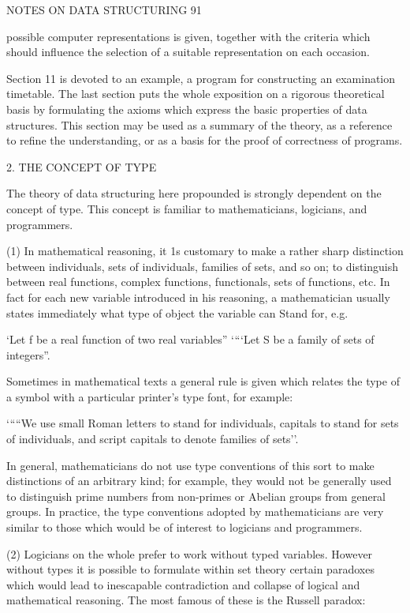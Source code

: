 NOTES ON DATA STRUCTURING 91

possible computer representations is given, together with the criteria which should influence the selection of a suitable representation on each occasion.

Section 11 is devoted to an example, a program for constructing an examination timetable. The last section puts the whole exposition on a rigorous theoretical basis by formulating the axioms which express the basic properties of data structures. This section may be used as a summary of the theory, as a reference to refine the understanding, or as a basis for the proof of correctness of programs.

2. THE CONCEPT OF TYPE

The theory of data structuring here propounded is strongly dependent on the concept of type. This concept is familiar to mathematicians, logicians, and programmers.

(1) In mathematical reasoning, it 1s customary to make a rather sharp distinction between individuals, sets of individuals, families of sets, and so on; to distinguish between real functions, complex functions, functionals, sets of functions, etc. In fact for each new variable introduced in his reasoning, a mathematician usually states immediately what type of object the variable can Stand for, e.g.

‘Let f be a real function of two real variables” ‘“‘Let S be a family of sets of integers”.

Sometimes in mathematical texts a general rule is given which relates the type of a symbol with a particular printer’s type font, for example:

‘““We use small Roman letters to stand for individuals, capitals to stand for sets of individuals, and script capitals to denote families of sets’’.

In general, mathematicians do not use type conventions of this sort to make distinctions of an arbitrary kind; for example, they would not be generally used to distinguish prime numbers from non-primes or Abelian groups from general groups. In practice, the type conventions adopted by mathematicians are very similar to those which would be of interest to logicians and programmers.

(2) Logicians on the whole prefer to work without typed variables. However without types it is possible to formulate within set theory certain paradoxes which would lead to inescapable contradiction and collapse of logical and mathematical reasoning. The most famous of these is the Russell paradox:


